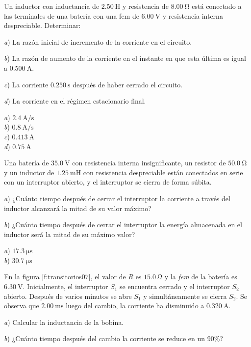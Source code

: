 %
\begin{Exercise}
    Un inductor con inductancia de $\SI{2.50}{\henry}$ y resistencia de $\SI{8.00}{\ohm}$ está conectado a las terminales de una batería con una fem de $\SI{6.00}{\volt}$ y resistencia interna despreciable. Determinar:\par
    \textit{a}) La razón inicial de incremento de la corriente en el circuito.\par
    \textit{b}) La razón de aumento de la corriente en el instante en que esta última es igual a $\SI{0.500}{\ampere}$.\par
    \textit{c}) La corriente $\SI{0.250}{\second}$ después de haber cerrado el circuito.\par
    \textit{d}) La corriente en el régimen estacionario final.
\end{Exercise}
\begin{Answer}
    \begin{minipage}[t]{.4\textwidth}
        \textit{a}) $\SI{2.4}{\ampere/\second}$\\ \textit{b}) $\SI{0.8}{\ampere/\second}$\\ \textit{c}) $\SI{0.413}{\ampere}$\\ \textit{d}) $\SI{0.75}{\ampere}$
    \end{minipage}
\end{Answer}
%
\begin{Exercise}
    Una batería de $\SI{35.0}{\volt}$ con resistencia interna insignificante, un resistor de $\SI{50.0}{\ohm}$ y un inductor de $\SI{1.25}{\milli\henry}$ con resistencia despreciable están conectados en serie con un interruptor abierto, y el interruptor se cierra de forma súbita.\par
    \textit{a}) ¿Cuánto tiempo después de cerrar el interruptor la corriente a través del inductor alcanzará la mitad de su valor máximo?\par
    \textit{b}) ¿Cuánto tiempo después de cerrar el interruptor la energía almacenada en el inductor será la mitad de su máximo valor?
\end{Exercise}
\begin{Answer}
    \begin{minipage}[t]{.4\textwidth}
        \textit{a}) $\SI{17.3}{\micro\second}$\\ \textit{b}) $\SI{30.7}{\micro\second}$
    \end{minipage}
\end{Answer}
%
\begin{Exercise}\label{p:transitorios07}
    En la figura \ref{f:transitorios07}, el valor de $R$ es $\SI{15.0}{\ohm}$ y la \textit{fem} de la batería es $\SI{6.30}{\volt}$. Inicialmente, el interruptor $S_1$ se encuentra cerrado y el interruptor $S_2$ abierto. Después de varios minutos se abre $S_1$ y simultáneamente se cierra $S_2$. Se observa que $\SI{2.00}{\milli\second}$ luego del cambio, la corriente ha disminuido a $\SI{0.320}{\ampere}$.\par
    \textit{a}) Calcular la inductancia de la bobina.\par
    \textit{b}) ¿Cuánto tiempo después del cambio la corriente se reduce en un 90\%?
\end{Exercise}
